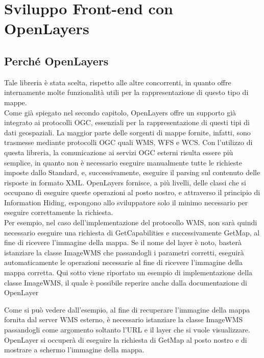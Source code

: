 \section{Sviluppo Front-end con OpenLayers}

\subsection{Perché OpenLayers}

Tale libreria è stata scelta, rispetto alle altre concorrenti, in quanto offre internamente molte funzionalità utili per la rappresentazione di questo tipo di mappe.
\\Come già spiegato nel secondo capitolo, OpenLayers offre un supporto già integrato ai protocolli OGC, essenziali per la rappresentazione di questi tipi di dati geospaziali. La maggior parte delle sorgenti di mappe fornite, infatti, sono trasmesse mediante protocolli OGC quali WMS, WFS e WCS. Con l'utilizzo di questa libreria, la comunicazione ai servizi OGC esterni risulta essere più semplice, in quanto non è necessario eseguire manualmente tutte le richieste imposte dallo Standard, e, successivamente, eseguire il parsing sul contenuto delle risposte in formato XML. OpenLayers fornisce, a più livelli, delle classi che si occupano di eseguire queste operazioni al posto nostro, e attraverso il principio di Information Hiding, espongono allo sviluppatore solo il minimo necessario per eseguire correttamente la richiesta.
\\Per esempio, nel caso dell'implementazione del protocollo WMS, non sarà quindi necessario eseguire una richiesta di GetCapabilities e successivamente GetMap, al fine di ricevere l'immagine della mappa. Se il nome del layer è noto, basterà istanziare la classe ImageWMS che passandogli i parametri corretti, eseguirà automaticamente le operazioni necessarie al fine di ricevere l'immagine della mappa corretta. Qui sotto viene riportato un esempio di implementazione della classe ImageWMS, il quale è possibile reperire anche dalla documentazione di OpenLayer\cite{DocumentazioneOpenLayersWMS}

Come si può vedere dall'esempio, al fine di recuperare l'immagine della mappa fornita dal server WMS esterno, è necessario istanziare la classe ImageWMS passandogli come argomento soltanto l'URL e il layer che si vuole visualizzare.
OpenLayer si occuperà di eseguire la richiesta di GetMap al posto nostro e di mostrare a schermo l'immagine della mappa.
